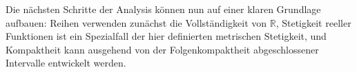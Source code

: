 \documentclass[main.tex]{subfiles}
\begin{document}
Die nächsten Schritte der Analysis können nun auf einer klaren Grundlage
aufbauen: Reihen verwenden zunächst die Vollständigkeit von
\(\mathbb R\), Stetigkeit reeller Funktionen ist ein Spezialfall der hier
definierten metrischen Stetigkeit, und Kompaktheit kann ausgehend von der
Folgenkompaktheit abgeschlossener Intervalle entwickelt werden.
\end{document}
